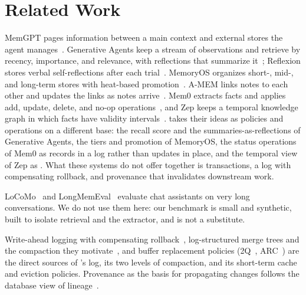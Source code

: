 \section{Related Work}
\label{sec:related}

MemGPT pages information between a main context and external stores the agent
manages~\cite{memgpt}. Generative Agents keep a stream of observations and
retrieve by recency, importance, and relevance, with reflections that summarize
it~\cite{generative}; Reflexion stores verbal self-reflections after each
trial~\cite{reflexion}. MemoryOS organizes short-, mid-, and long-term stores
with heat-based promotion~\cite{memoryos}. A-MEM links notes to each other and
updates the links as notes arrive~\cite{amem}. Mem0 extracts facts and applies
add, update, delete, and no-op operations~\cite{mem0}, and Zep keeps a temporal
knowledge graph in which facts have validity intervals~\cite{zep}. \sys takes
their ideas as policies and operations on a different base: the recall score and
the summaries-as-reflections of Generative Agents, the tiers and promotion of
MemoryOS, the status operations of Mem0 as records in a log rather than updates
in place, and the temporal view of Zep as . What these systems
do not offer together is transactions, a log with compensating rollback, and
provenance that invalidates downstream work.

LoCoMo~\cite{locomo} and LongMemEval~\cite{longmemeval} evaluate chat assistants
on very long conversations. We do not use them here: our benchmark is small and
synthetic, built to isolate retrieval and the extractor, and is not a substitute.

Write-ahead logging with compensating rollback~\cite{aries}, log-structured
merge trees and the compaction they motivate~\cite{lsm}, and buffer replacement
policies (2Q~\cite{twoq}, ARC~\cite{arc}) are the direct sources of \sys's log,
its two levels of compaction, and its short-term cache and eviction policies.
Provenance as the basis for propagating changes follows the database view of
lineage~\cite{semirings}.
